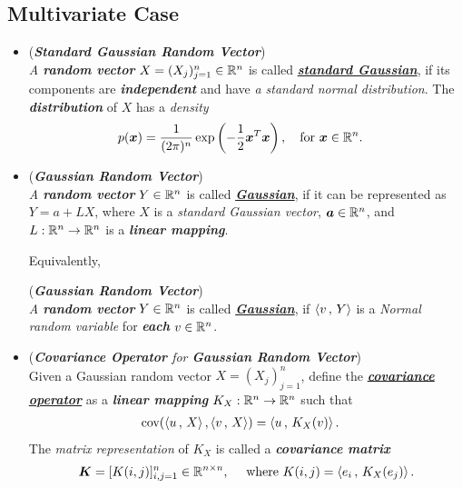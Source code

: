 \documentclass[11pt]{article}
\begin{document}
\subsection{Multivariate Case}
\begin{itemize}
\item \begin{definition} (\emph{\textbf{Standard Gaussian Random Vector}})\\
\emph{A \textbf{random vector}} $X =(X_j)_{j=1}^{n} \in {\mathbb R}^n$ is called \underline{\emph{\textbf{standard Gaussian}}}, if its components are \emph{\textbf{independent}} and have \emph{a standard normal distribution}. The \emph{\textbf{distribution}} of $X$ has a \emph{density}
\begin{align}
p(\boldsymbol{x}) &= \frac{1}{(2\pi)^{n}}\exp\left( -\frac{1}{2}\boldsymbol{x}^{T}\boldsymbol{x} \right), \quad \text{for $\boldsymbol{x} \in {\mathbb R}^{n}$.} \label{expr: mul_Normal_density}
\end{align} 
\end{definition}

\item \begin{definition} (\emph{\textbf{Gaussian Random Vector}})\\
\emph{A \textbf{random vector}} $Y \in {\mathbb R}^n$ is called \underline{\emph{\textbf{Gaussian}}}, if it can be represented as $Y = a+ L X$, where $X$ is a \emph{standard Gaussian vector}, $\boldsymbol{a} \in {\mathbb R}^n$, and $L: {\mathbb R}^n \rightarrow {\mathbb R}^n$ is a \emph{\textbf{linear mapping}}.
\end{definition}

Equivalently,
\begin{definition} (\emph{\textbf{Gaussian Random Vector}})\\
\emph{A \textbf{random vector}} $Y \in {\mathbb R}^n$ is called \underline{\emph{\textbf{Gaussian}}}, if $\left\langle v\,,\, Y \right\rangle$ is a \emph{Normal random variable} for \textbf{\emph{each}} $v \in {\mathbb R}^n$.
\end{definition}

\item \begin{definition} (\emph{\textbf{Covariance Operator} for \textbf{Gaussian Random Vector}})\\
Given a Gaussian random vector $X = (X_j)_{j=1}^{n}$,  define the \underline{\emph{\textbf{covariance operator}}} as a \emph{\textbf{linear mapping}} $K_X: {\mathbb R}^{n} \rightarrow {\mathbb R}^{n}$ such that 
\begin{align*}
\text{cov}(\left\langle u\,,\, X \right\rangle, \left\langle v\,,\, X \right\rangle) &= \left\langle u\,,\, K_X(v) \right\rangle.
\end{align*} The \emph{matrix representation} of $K_X$ is called a \emph{\textbf{covariance matrix}} 
\begin{align*}
\boldsymbol{K} = [K(i,j)]_{i,j=1}^{n} \in {\mathbb R}^{n \times n}, \quad \text{ where } K(i,j)= \left\langle e_i\,,\, K_X(e_j) \right\rangle.
\end{align*}
\end{definition}


\end{itemize}
\end{document}
